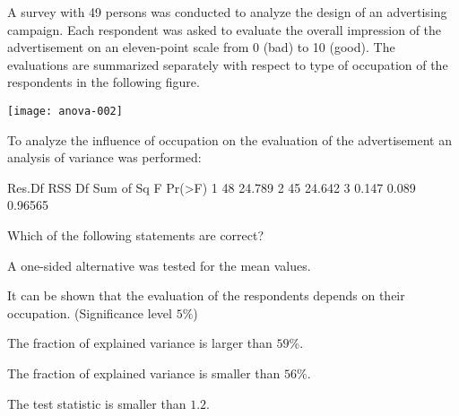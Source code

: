 
\begin{question}
A survey with 49 persons was conducted to analyze the
design of an advertising campaign. Each respondent was asked to
evaluate the overall impression of the advertisement on an
eleven-point scale from 0 (bad) to 10 (good). The evaluations are
summarized separately with respect to type of occupation of the
respondents in the following figure.

\texttt{[image: anova-002]}

To analyze the influence of occupation on the evaluation of the
advertisement an analysis of variance was performed:

\begin{Schunk}
\begin{Soutput}
  Res.Df    RSS Df Sum of Sq     F  Pr(>F)
1     48 24.789                           
2     45 24.642  3     0.147 0.089 0.96565
\end{Soutput}
\end{Schunk}

Which of the following statements are correct?

\begin{answerlist}
  \item A one-sided alternative was tested for the mean values.
  \item It can be shown that the evaluation of the respondents depends on their occupation. (Significance level $5\%$)
  \item The fraction of explained variance is larger than $59$\%.
  \item The fraction of explained variance is smaller than $56$\%.
  \item The test statistic is smaller than $1.2$.
\end{answerlist}
\end{question}

